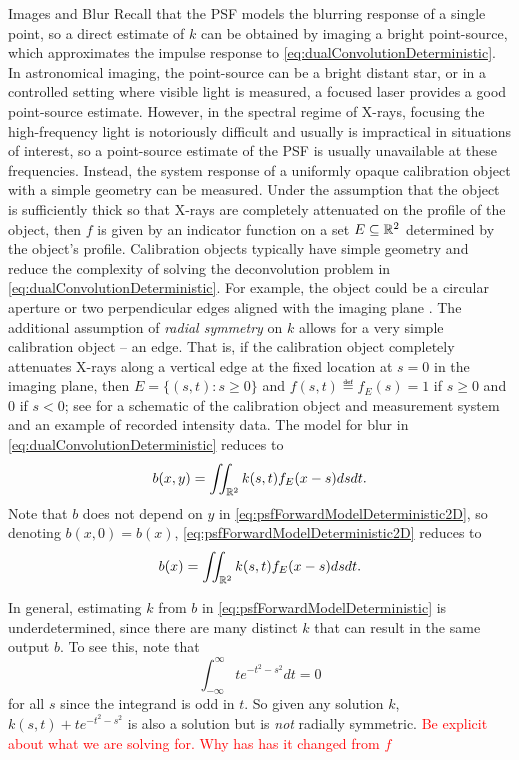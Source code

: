 \begin{chapter}{Images and Blur}
  Recall that the PSF models the blurring response of a single point, so a direct estimate of $k$ can be obtained by imaging a bright point-source, which approximates the impulse response to \eqref{eq:dualConvolutionDeterministic}.
  In astronomical imaging, the point-source can be a bright distant star, or in a controlled setting where visible light is measured, a focused laser provides a good point-source estimate.
  However, in the spectral regime of X-rays, focusing the high-frequency light is notoriously difficult and usually is impractical in situations of interest, so a point-source estimate of the PSF is usually unavailable at these frequencies.
  Instead, the system response of a uniformly opaque calibration object with a simple geometry can be measured.
  Under the assumption that the object is sufficiently thick so that X-rays are completely attenuated on the profile of the object, then $f$ is given by an indicator function on a set $E \subseteq \mathbb R^2$ determined by the object's profile.
  Calibration objects typically have simple geometry and reduce the complexity of solving the deconvolution problem in \eqref{eq:dualConvolutionDeterministic}.  
  For example, the object could be a circular aperture or two perpendicular edges aligned with the imaging plane \citep{doering1992,watson1993}.
  The additional assumption of \emph{radial symmetry} on $k$ allows for a very simple calibration object -- an edge. 
  That is, if the calibration object completely attenuates X-rays along a vertical edge at the fixed location at $s=0$ in the imaging plane, then $E=\{(s,t):s\ge0\}$ and $f(s,t) \eqdef f_E(s) = 1$ if $s\ge0$ and $0$ if $s <0$; see  for a schematic of the calibration object and measurement system and an example of recorded intensity data.
  The model for blur in \eqref{eq:dualConvolutionDeterministic} reduces to
\begin{equation}\label{eq:psfForwardModelDeterministic2D}
  b(x,y) = \iint_{\mathbb R^2} k(s,t) f_E(x-s)dsdt. 
\end{equation}
  Note that $b$ does not depend on $y$ in \eqref{eq:psfForwardModelDeterministic2D}, so denoting $b(x,0) = b(x)$, \eqref{eq:psfForwardModelDeterministic2D} reduces to
\begin{equation}\label{eq:psfForwardModelDeterministic}
  b(x) = \iint_{\mathbb R^2} k(s,t) f_E(x-s)dsdt. 
\end{equation} 
  
  In general, estimating $k$ from $b$ in \eqref{eq:psfForwardModelDeterministic} is underdetermined, since there are many distinct $k$ that can result in the same output $b$.
  To see this, note that 
  \begin{equation}
    \int_{-\infty}^{\infty} te^{-t^2 - s^2}dt = 0
  \end{equation}
  for all $s$ since the integrand is odd in $t$.
  So given any solution $k$, $k(s,t)+te^{-t^2 - s^2}$ is also a solution but is \emph{not} radially symmetric.
  \textcolor{red}{
    Be explicit about what we are solving for. Why has has it changed from $f$
  }


\end{chapter}
